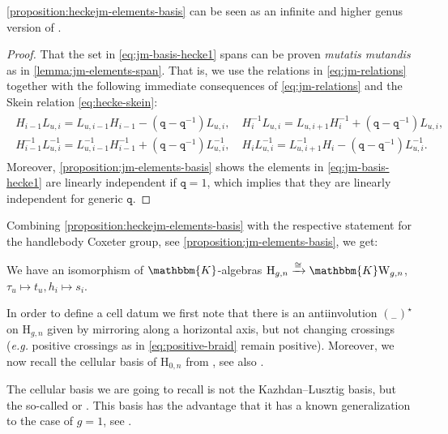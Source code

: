 \documentclass[a4paper,11pt]{amsart}
\let\emph\relax
\newcommand{\eg}{\textsl{e.g.}}
\newcommand{\muta}{\textsl{mutatis mutandis}}
\newcommand{\placeholder}{{}_{-}}
\newcommand{\setstuff}[1]{\mathrm{#1}}
\newcommand{\KK}{\mathbbm{K}}
\newcommand{\varsym}[1]{\mathtt{#1}}
\newcommand{\jm}{L}
\newcommand{\qvar}{\varsym{q}}
\numberwithin{equation}{section}
\let\fullref\autoref
\begin{document}
\fullref{proposition:heckejm-elements-basis} can be seen 
as an infinite and higher genus version of
\cite[Equation (3.10)]{ArKo-hecke-algebra}.

\begin{proof}
That the set in \eqref{eq:jm-basis-hecke1} spans can be proven {\muta} as 
in \fullref{lemma:jm-elements-span}. 
That is, we use the relations in \eqref{eq:jm-relations} 
together with the following immediate consequences 
of \eqref{eq:jm-relations} and the Skein relation \eqref{eq:hecke-skein}:
\begin{gather}\label{eq:hecke-pull}
\begin{gathered}
H_{i-1}\jm_{u,i}
=
\jm_{u,i-1}H_{i-1}
-(\qvar-\qvar^{-1})\jm_{u,i}
,\quad
H_{i}^{-1}\jm_{u,i}
=
\jm_{u,i+1}H_{i}^{-1}
+(\qvar-\qvar^{-1})\jm_{u,i}
,\\
H_{i-1}^{-1}\jm_{u,i}^{-1}
=
\jm_{u,i-1}^{-1}H_{i-1}^{-1}
+(\qvar-\qvar^{-1})\jm_{u,i}^{-1}
,\quad
H_{i}\jm_{u,i}^{-1}
=
\jm_{u,i+1}^{-1}H_{i}
-(\qvar-\qvar^{-1})\jm_{u,i}^{-1}.
\end{gathered}
\end{gather}
Moreover, 
\fullref{proposition:jm-elements-basis} shows the elements in \eqref{eq:jm-basis-hecke1} are 
linearly independent if $\qvar=1$, which implies that they are linearly independent for generic $\qvar$.
\end{proof}

Combining \fullref{proposition:heckejm-elements-basis} 
with the respective 
statement for the handlebody Coxeter group, see \fullref{proposition:jm-elements-basis}, we get:

\begin{corollary}
We have an isomorphism of $\KK$-algebras $\setstuff{H}_{g,n}\xrightarrow{\cong}\KK\setstuff{W}_{g,n}$, 
$\tau_{u}\mapsto t_{u},h_{i}\mapsto s_{i}$.
\end{corollary}

In order to define a cell datum we first note that
there is an antiinvolution $(\placeholder)^{\star}$ 
on $\setstuff{H}_{g,n}$ given by mirroring along a horizontal 
axis, but not changing crossings ({\eg} positive crossings
as in \eqref{eq:positive-braid} remain positive).
Moreover, we now recall the 
cellular basis of $\setstuff{H}_{0,n}$ from \cite{Mu-typea-hecke}, see also \cite[Chapter 3]{Ma-hecke-schur}. 

\begin{remark}
The cellular basis we are going to recall is not the Kazhdan--Lusztig 
basis, but the so-called \emph{Murphy basis} or
\emph{standard basis}. This basis 
has the advantage that it has a known generalization to the case of $g=1$, 
see \cite{DiJaMa-cyclotomic-q-schur}.
\end{remark}
\end{document}
